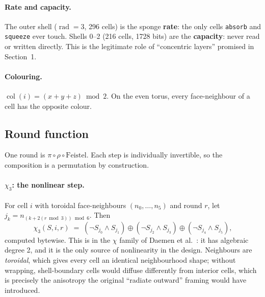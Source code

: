 \documentclass[11pt,a4paper]{article}
\theoremstyle{plain}
\theoremstyle{definition}
\theoremstyle{remark}
\begin{document}
\paragraph{Rate and capacity.} The outer shell ($\operatorname{rad} = 3$, 296 cells) is
the sponge \textbf{rate}: the only cells \texttt{absorb} and \texttt{squeeze} ever
touch. Shells 0--2 (216 cells, 1728 bits) are the \textbf{capacity}: never read or
written directly. This is the legitimate role of ``concentric layers'' promised in
Section~1.

\paragraph{Colouring.} $\operatorname{col}(i) = (x+y+z) \bmod 2$. On the even torus,
every face-neighbour of a cell has the opposite colour.

\subsection{Round function}

One round is $\pi \circ \rho \circ \mathrm{Feistel}$. Each step is individually
invertible, so the composition is a permutation by construction.

\paragraph{$\chi_3$: the nonlinear step.} For cell $i$ with toroidal face-neighbours
$(n_0,\dots,n_5)$ and round $r$, let $j_k = n_{(k + 2(r \bmod 3)) \bmod 6}$. Then
\[
\chi_3(S,i,r) \;=\; (\lnot S_{j_0} \wedge S_{j_1}) \oplus
                   (\lnot S_{j_2} \wedge S_{j_3}) \oplus
                   (\lnot S_{j_4} \wedge S_{j_5}),
\]
computed bytewise. This is in the $\chi$ family of Daemen et al.~\cite{daemen94}: it
has algebraic degree 2, and it is the only source of nonlinearity in the design.
Neighbours are \emph{toroidal}, which gives every cell an identical neighbourhood
shape; without wrapping, shell-boundary cells would diffuse differently from interior
cells, which is precisely the anisotropy the original ``radiate outward'' framing
would have introduced.
\end{document}

